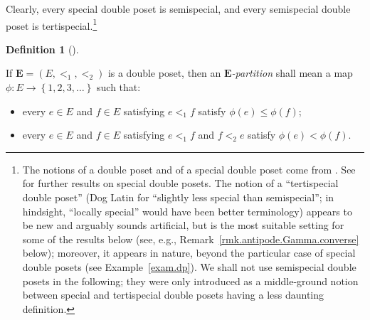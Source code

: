 \documentclass[numbers=enddot,12pt,final,onecolumn,notitlepage,abstracton]{scrartcl}
\theoremstyle{definition}
\newtheorem{defi}[theo]{Definition}
\newenvironment{definition}[1][]
{\begin{defi}[#1]\begin{leftbar}}
{\end{leftbar}\end{defi}}
\newcommand{\EE}{{\mathbf{E}}}
\begin{document}
Clearly, every special double poset is semispecial, and every
semispecial double poset is tertispecial.\footnote{The notions of a
double poset and of a special double poset come from
\cite{Mal-Reu-DP}. See \cite{Foissy13} for further results on
special double posets.
The notion of a ``tertispecial double poset''
(Dog Latin for ``slightly less special than semispecial''; in
hindsight, ``locally special'' would have been better terminology)
appears to be new and arguably sounds artificial, but is the
most suitable setting for some of the results below (see, e.g.,
Remark~\ref{rmk.antipode.Gamma.converse} below); moreover,
it appears in nature, beyond the particular case of special
double posets (see Example~\ref{exam.dp}).
We shall not use semispecial
double posets in the following; they were only introduced as a
middle-ground notion between special and tertispecial double posets
having a less daunting definition.}

\begin{definition}
\label{def.E-partition}
If $\EE = \left(E, <_1, <_2\right)$ is a double poset, then
an \textit{$\EE$-partition} shall mean a map
$\phi : E \to \left\{ 1,2,3,\ldots\right\}$ such that:
\begin{itemize}
\item every $e \in E$ and $f \in E$ satisfying $e <_1 f$ satisfy
$\phi\left(e\right) \leq \phi\left(f\right)$;
\item every $e \in E$ and $f \in E$ satisfying $e <_1 f$ and
$f <_2 e$ satisfy $\phi\left(e\right) < \phi\left(f\right)$.
\end{itemize}
\end{definition}
\end{document}

